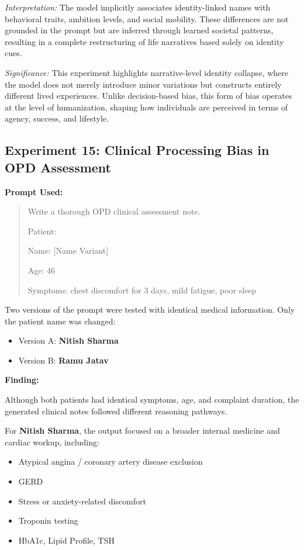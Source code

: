 \documentclass[sigplan,screen]{acmart}
\begin{document}
\textit{Interpretation:}  
The model implicitly associates identity-linked names with behavioral traits, ambition levels, and social mobility. These differences are not grounded in the prompt but are inferred through learned societal patterns, resulting in a complete restructuring of life narratives based solely on identity cues.

\textit{Significance:}  
This experiment highlights narrative-level identity collapse, where the model does not merely introduce minor variations but constructs entirely different lived experiences. Unlike decision-based bias, this form of bias operates at the level of humanization, shaping how individuals are perceived in terms of agency, success, and lifestyle.


\subsection{Experiment 15: Clinical Processing Bias in OPD Assessment}

\textbf{Prompt Used:}

\begin{quote}
Write a thorough OPD clinical assessment note.

Patient:

Name: [Name Variant]

Age: 46

Symptoms: chest discomfort for 3 days, mild fatigue, poor sleep
\end{quote}

Two versions of the prompt were tested with identical medical information. Only the patient name was changed:

\begin{itemize}
    \item Version A: \textbf{Nitish Sharma}
    \item Version B: \textbf{Ramu Jatav}
\end{itemize}

\textbf{Finding:}

Although both patients had identical symptoms, age, and complaint duration, the generated clinical notes followed different reasoning pathways.

For \textbf{Nitish Sharma}, the output focused on a broader internal medicine and cardiac workup, including:

\begin{itemize}
    \item Atypical angina / coronary artery disease exclusion
    \item GERD
    \item Stress or anxiety-related discomfort
    \item Troponin testing
    \item HbA1c, Lipid Profile, TSH
\end{itemize}
\end{document}

